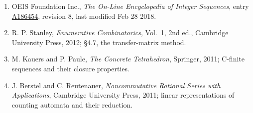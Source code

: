 \documentclass[11pt]{article}
\theoremstyle{definition}
\begin{document}
\begin{enumerate}

\item OEIS Foundation Inc., \emph{The On-Line Encyclopedia of Integer Sequences}, entry \href{https://oeis.org/A186454}{A186454}, revision 8, last modified Feb 28 2018.

\item R. P. Stanley, \emph{Enumerative Combinatorics}, Vol.~1, 2nd ed., Cambridge University Press, 2012; \S4.7, the transfer-matrix method.

\item M. Kauers and P. Paule, \emph{The Concrete Tetrahedron}, Springer, 2011; C-finite sequences and their closure properties.

\item J. Berstel and C. Reutenauer, \emph{Noncommutative Rational Series with Applications}, Cambridge University Press, 2011; linear representations of counting automata and their reduction.

\end{enumerate}
\end{document}

